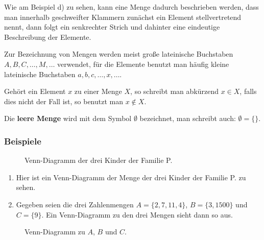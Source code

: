 Wie am Beispiel d) zu sehen, kann eine Menge dadurch beschrieben werden, dass man innerhalb geschweifter Klammern zunächst ein Element stellvertretend nennt, dann folgt ein senkrechter Strich und dahinter eine eindeutige Beschreibung der Elemente.

Zur Bezeichnung von Mengen werden meist große lateinische Buchstaben $A, B, C, \ldots, M, \ldots$ verwendet, für die Elemente benutzt man häufig kleine lateinische Buchstaben $a, b, c, \ldots, x, \ldots$.

Gehört ein Element $x$ zu einer Menge $X$, so schreibt man abkürzend $x \in X$, falls dies nicht der Fall ist, so benutzt man $x \notin X$.

Die \textbf{leere Menge} wird mit dem Symbol $\emptyset$ bezeichnet, man schreibt auch: $\emptyset = \{\}$.

\subsubsection{Beispiele}

\begin{figure}[h]
  \centering
  \caption*{Venn-Diagramm der drei Kinder der Familie P.}
\end{figure}

\begin{enumerate}[label=\alph*)]
  \item Hier ist ein Venn-Diagramm der Menge der drei Kinder der Familie P. zu sehen.
  \item Gegeben seien die drei Zahlenmengen $A = \{2,7,11,4\}$, $B = \{3,1500\}$ und $C = \{9\}$. Ein Venn-Diagramm zu den drei Mengen sieht dann so aus.
\end{enumerate}

\begin{figure}[h]
  \centering
  \caption*{Venn-Diagramm zu $A$, $B$ und $C$.}
\end{figure}

